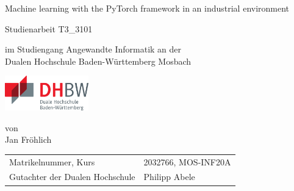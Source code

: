 \def\doctype{Studienarbeit T3\_3101}
\def\title{Machine learning with the PyTorch framework in an industrial environment}
\def\author{Jan Fröhlich}

\begin{titlepage}

	\vspace{10mm}

	\begin{center}
		\vspace{5mm}

		\huge \title

		\vspace{42.6pt}

		\large \doctype

		\vspace{42.6pt}

		\small im Studiengang Angewandte Informatik an der \\
		\large Dualen Hochschule Baden-Württemberg Mosbach

		\vspace{14.2pt}

		\includegraphics[height=1.5cm]{assets/logo-dhbw.eps}

		\vspace{42.6pt}

		\small von \\
		\large \author
	\end{center}

	\vspace{98.6pt}

	\begin{table}[h]
		\centering
		\begin{tabular}{ll}
			\small Matrikelnummer, Kurs            & 2032766, MOS-INF20A        \\
			\small Gutachter der Dualen Hochschule & Philipp Abele              \\
		\end{tabular}
	\end{table}

	\vspace{49.7pt}


\end{titlepage}
